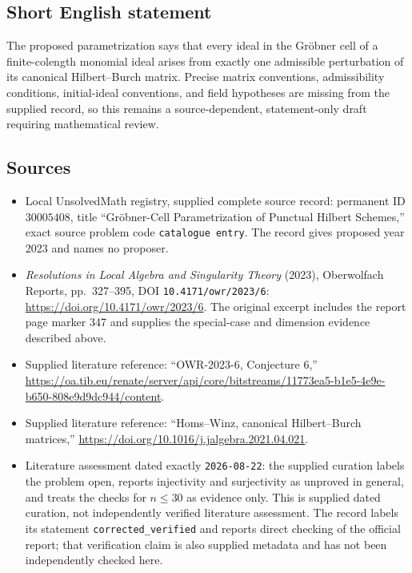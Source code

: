 \documentclass[11pt]{article}
\begin{document}
\subsection{Short English statement}
The proposed parametrization says that every ideal in the Gr\"obner cell of a finite-colength monomial ideal arises from exactly one admissible perturbation of its canonical Hilbert--Burch matrix. Precise matrix conventions, admissibility conditions, initial-ideal conventions, and field hypotheses are missing from the supplied record, so this remains a source-dependent, statement-only draft requiring mathematical review.
\subsection{Sources}
\begin{itemize}
\item Local UnsolvedMath registry, supplied complete source record: permanent ID \(30005408\), title ``Gr\"obner-Cell Parametrization of Punctual Hilbert Schemes,'' exact source problem code \texttt{catalogue entry}. The record gives proposed year 2023 and names no proposer.
\item \emph{Resolutions in Local Algebra and Singularity Theory} (2023), Oberwolfach Reports, pp.~327--395, DOI \texttt{10.4171/owr/2023/6}: \url{https://doi.org/10.4171/owr/2023/6}. The original excerpt includes the report page marker 347 and supplies the special-case and dimension evidence described above.
\item Supplied literature reference: ``OWR-2023-6, Conjecture 6,'' \url{https://oa.tib.eu/renate/server/api/core/bitstreams/11773ea5-b1e5-4e9e-b650-808e9d9dc944/content}.
\item Supplied literature reference: ``Homs--Winz, canonical Hilbert--Burch matrices,'' \url{https://doi.org/10.1016/j.jalgebra.2021.04.021}.
\item Literature assessment dated exactly \texttt{2026-08-22}: the supplied curation labels the problem open, reports injectivity and surjectivity as unproved in general, and treats the checks for \(n\leq 30\) as evidence only. This is supplied dated curation, not independently verified literature assessment. The record labels its statement \texttt{corrected\_verified} and reports direct checking of the official report; that verification claim is also supplied metadata and has not been independently checked here.
\end{itemize}
\end{document}
